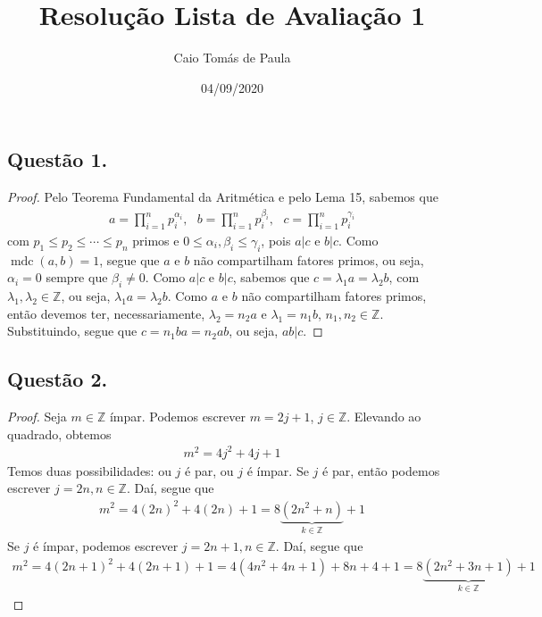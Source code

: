 \documentclass[a4paper,12pt]{article}
\title{Resolução Lista de Avaliação 1}
\date{04/09/2020}
\author{Caio Tomás de Paula}
\DeclareMathOperator{\mdc}{mdc}
\theoremstyle{definition}
\begin{document}
	\maketitle
	\subsection*{Questão 1.}
	\begin{proof}
	Pelo Teorema Fundamental da Aritmética e pelo Lema 15, sabemos que
	\begin{align*}
	a = \prod_{i=1}^{n}p_i^{\alpha_i}, \text{  }
	b = \prod_{i=1}^{n}p_i^{\beta_i}, \text{  }
	c = \prod_{i=1}^{n}p_i^{\gamma_i}
	\end{align*}
	com $p_1\leq p_2\leq \cdots \leq p_n$ primos e $0\leq \alpha_i, \beta_i \leq \gamma_i$, pois $a|c$ e $b|c$. Como $\mdc(a,b) = 1$, segue que $a$ e $b$ não compartilham fatores primos, ou seja, $\alpha_i = 0$ sempre que $\beta_i\neq 0$. Como $a|c$ e $b|c$, sabemos que $c = \lambda_1a = \lambda_2b$, com $\lambda_1, \lambda_2\in\mathbb{Z}$, ou seja, $\lambda_1a = \lambda_2b$. Como $a$ e $b$ não compartilham fatores primos, então devemos ter, necessariamente, $\lambda_2 = n_2a$ e $\lambda_1 = n_1b$, $n_1, n_2\in\mathbb{Z}$. Substituindo, segue que $c = n_1ba = n_2ab$, ou seja, $ab|c$.
\end{proof}
\subsection*{Questão 2.}
\begin{proof}
	Seja $m\in\mathbb{Z}$ ímpar. Podemos escrever $m = 2j + 1$, $j\in\mathbb{Z}$. Elevando ao quadrado, obtemos
	\begin{align*}
	m^2 = 4j^2 + 4j + 1
	\end{align*}
	Temos duas possibilidades: ou $j$ é par, ou $j$ é ímpar. Se $j$ é par, então podemos escrever $j = 2n, n\in\mathbb{Z}$. Daí, segue que
	\begin{align*}
	m^2 = 4(2n)^2 + 4(2n) + 1 = 8\underbrace{(2n^2 + n)}_{k\in\mathbb{Z}} + 1
	\end{align*}
	Se $j$ é ímpar, podemos escrever $j = 2n+1, n\in\mathbb{Z}$. Daí, segue que
	\begin{align*}
	m^2 = 4(2n+1)^2 + 4(2n + 1) + 1 = 4(4n^2 + 4n + 1) + 8n + 4 + 1 =8\underbrace{(2n^2 + 3n + 1)}_{k\in\mathbb{Z}} + 1
	\end{align*}
\end{proof}
\end{document}
